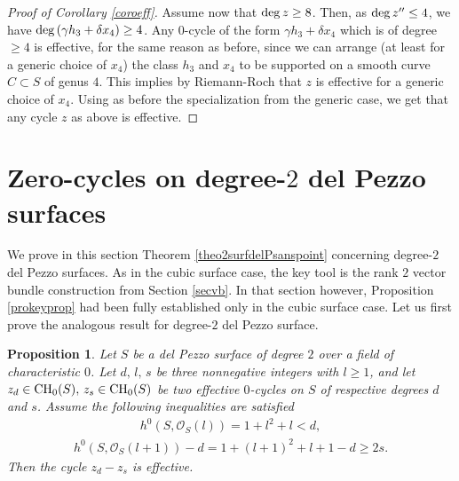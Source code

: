 \documentclass[10pt]{article}
\newtheorem{prop}[theo]{Proposition}
\begin{document}
\begin{proof}[Proof of Corollary \ref{coroeff}]
Assume now that  ${\rm deg}\,z\geq 8$. Then, as ${\rm deg}\,z''\leq 4$, we have ${\rm deg}\,(\gamma h_3+\delta x_4)\geq 4$. Any $0$-cycle of the form $\gamma h_3+\delta x_4$ which is of degree $\geq 4$ is effective, for the same reason as before, since we can arrange (at least for a generic choice of $x_4$) the class $h_3$ and $x_4$ to be supported on a smooth curve $C\subset S$ of genus $4$.
This implies by Riemann-Roch  that  $z$ is effective for a generic choice of $x_4$. Using as before the specialization  from the generic case, we get that any cycle $z$ as above is effective.
\end{proof}




\section{Zero-cycles on degree-$2$ del Pezzo surfaces \label{secdelpezzo}}
We prove in this section Theorem  \ref{theo2surfdelPsanspoint} concerning degree-$2$ del Pezzo surfaces. As in the cubic surface case, the key tool is the rank $2$ vector bundle construction from Section \ref{secvb}. In that section however, Proposition \ref{prokeyprop} had been fully established only in the cubic surface case. Let us first prove the analogous result for degree-$2$ del Pezzo surface.
\begin{prop}\label{prokeypropdp2} Let $S$ be a del Pezzo surface of degree $2$ over a field of characteristic $0$. Let $d,\,l,\,s$ be three nonnegative integers with $l\geq 1$, and let $z_d\in{\rm CH}_0(S),\,z_s\in{\rm CH}_0(S)$ be two effective $0$-cycles on $S$ of respective degrees $d$ and $s$.
Assume the following inequalities are satisfied
\begin{eqnarray}\label{eqineqdp21} h^0(S,\mathcal{O}_S(l))=1+l^2+l<d,
\end{eqnarray}
\begin{eqnarray}\label{eqineqdp22}  h^0(S,\mathcal{O}_S(l+1))-d=1+(l+1)^2+l+1-d\geq 2s.
\end{eqnarray}
Then the cycle $z_d-z_s$ is effective.
\end{prop}
\end{document}
